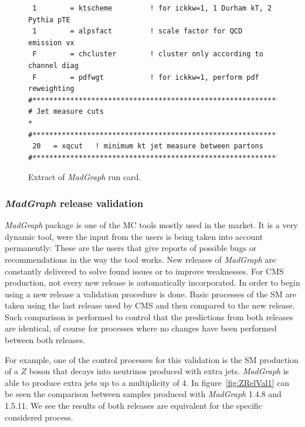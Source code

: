 \begin{itemize}
\begin{itemize}
\begin{figure}[!Hhtbp]
\begin{center}
\begin{minipage}[c]{0.7\textwidth}
\begin{verbatim}
 1        = ktscheme         ! for ickkw=1, 1 Durham kT, 2 Pythia pTE
 1        = alpsfact         ! scale factor for QCD emission vx
 F        = chcluster        ! cluster only according to channel diag
 F        = pdfwgt           ! for ickkw=1, perform pdf reweighting
#*********************************************************************
# Jet measure cuts                                                   *
#*********************************************************************
 20   = xqcut   ! minimum kt jet measure between partons
#*********************************************************************
\end{verbatim}
\normalsize
        \end{minipage}
          \caption{Extract of \textit{MadGraph} run card.}
          \label{fig:RunCard}
      \end{center}
    \end{figure}

  \end{itemize}
\end{itemize}


\subsubsection{\textit{MadGraph} release validation}

\textit{MadGraph} package is one of the MC tools mostly used in the market. It is a very dynamic tool, were the input from the users is being taken into account permanently: These are the users that give reports of possible bugs or recommendations in the way the tool works. New releases of \textit{MadGraph} are constantly delivered to solve found issues or to improve weaknesses. For CMS production, not every new release is automatically incorporated. In order to begin using a new release a validation procedure is done. Basic processes of the SM are taken using the last release used by CMS and then compared to the new release. Such comparison is performed to control that the predictions from both releases are identical, of course for processes where no changes have been performed between both releases. 

For example, one of the control processes for this validation is the SM production of a $Z$ boson that decays into neutrinos produced with extra jets. \textit{MadGraph} is able to produce extra jets up to a multiplicity of 4. In figure~\ref{fig:ZRelVal1} can be seen the comparison between samples produced with \textit{MadGraph} 1.4.8 and 1.5.11. We see the results of both releases are equivalent for the specific considered process.


